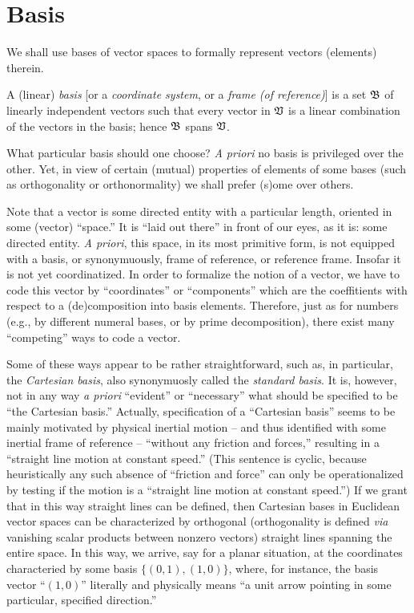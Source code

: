 \section{Basis}
\label{2012-m-ch-fdvs-Basis}

We shall use bases of vector spaces to formally represent vectors (elements) therein.

A (linear) {\em basis}
[or a {\em coordinate system}, or a {\em frame (of reference)}]
is a set    $\frak B$
of linearly independent vectors
such that every vector
in $\frak V$ is a linear combination of the vectors in the basis; hence
$\frak B$ spans $\frak V$.

What particular basis should one choose?
{\em A priori} no basis is privileged over the other.
Yet, in view of certain (mutual) properties of elements of some bases (such as orthogonality or orthonormality)
we shall prefer (s)ome over others.


Note that a vector is some directed entity with a particular length,
oriented in some (vector) ``space.''
It is ``laid out there'' in front of our eyes, as it is: some directed entity.
{\it A priori}, this space, in its most primitive form,
is not equipped with a basis, or synonymuously, frame of reference, or reference frame.
Insofar it is not yet coordinatized.
In order to formalize the notion of a vector, we have to code this vector by ``coordinates''
or ``components'' which are the coeffitients with respect to a (de)composition into basis elements.
Therefore, just as for numbers (e.g., by different numeral bases, or by prime decomposition),
there exist many ``competing'' ways to code a vector.

Some of these ways appear to be rather straightforward,
such as, in particular, the {\em Cartesian basis},
also synonymuosly called the  {\em standard basis}.
It is, however, not in any way {\it a priori}
``evident'' or ``necessary'' what should be specified to be ``the Cartesian basis.''
Actually, specification of a ``Cartesian basis'' seems to be mainly motivated by
physical inertial motion --
and thus identified with some inertial frame of reference --
``without any friction and
forces,'' resulting in a ``straight line motion at constant speed.''
(This sentence is  cyclic, because heuristically any such absence of ``friction and
force''  can only be operationalized by testing if the motion is a
``straight line motion at constant speed.'')
If we grant that in this way straight lines can be defined, then
Cartesian bases in Euclidean vector spaces can be characterized by
orthogonal (orthogonality is defined {\it via} vanishing scalar products between nonzero vectors)
straight lines spanning the entire space.
In this way, we arrive, say for a planar situation, at the coordinates
characteried by some basis $\{(0,1),(1,0)\}$,
where, for instance, the basis vector ``$(1,0)$'' literally and physically
means ``a unit arrow pointing in some particular, specified direction.''

